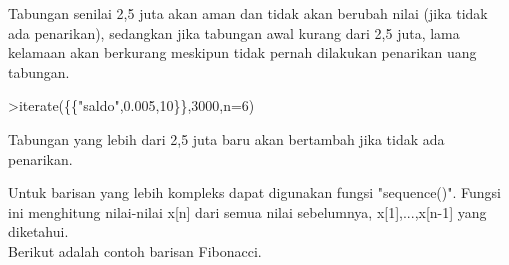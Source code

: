\documentclass{article}
\newenvironment{eulernotebook}{\par}{\par}
\newenvironment{eulercomment}{\par\medskip}{\par\medskip}
\begin{document}
\begin{eulernotebook}
\begin{eulercomment}
\begin{eulercomment}
\begin{eulercomment}
\begin{eulercomment}
\begin{eulercomment}
Tabungan senilai 2,5 juta akan aman dan tidak akan berubah nilai (jika tidak ada penarikan),
sedangkan jika tabungan awal kurang dari 2,5 juta, lama kelamaan akan berkurang meskipun
tidak pernah dilakukan penarikan uang tabungan.
\end{eulercomment}
\begin{eulerprompt}
>iterate(\{\{"saldo",0.005,10\}\},3000,n=6)
\end{eulerprompt}
\begin{euleroutput}
  [3000,  3002,  3004.01,  3006.03,  3008.05,  3010.08,  3012.12]
\end{euleroutput}
\begin{eulercomment}
Tabungan yang lebih dari 2,5 juta baru akan bertambah jika tidak ada penarikan.

Untuk barisan yang lebih kompleks dapat digunakan fungsi "sequence()". Fungsi ini menghitung
nilai-nilai x[n] dari semua nilai sebelumnya, x[1],...,x[n-1] yang diketahui.\\
Berikut adalah contoh barisan Fibonacci.


\end{eulercomment}
\end{eulercomment}
\end{eulercomment}
\end{eulercomment}
\end{eulercomment}
\end{eulernotebook}
\end{document}

